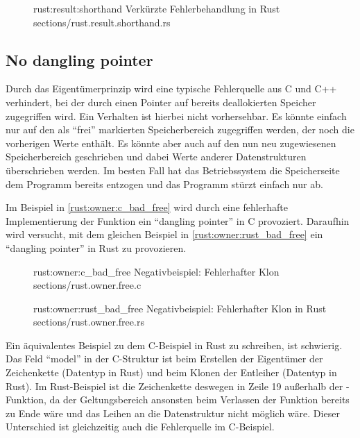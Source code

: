 \begin{figure}[H]
	\rustcinclude
		{rust:result:shorthand}
		{Verkürzte Fehlerbehandlung in Rust}
		{sections/rust.result.shorthand.rs}
\end{figure}



\subsection{No dangling pointer}
\label{rust:guarantee:no_dangling_pointer}

Durch das Eigentümerprinzip wird eine typische Fehlerquelle aus C und C++ verhindert, bei der durch einen Pointer auf bereits deallokierten Speicher zugegriffen wird.
Ein Verhalten ist hierbei nicht vorhersehbar. Es könnte einfach nur auf den als \enquote{frei} markierten Speicherbereich zugegriffen werden, der noch die vorherigen Werte enthält.
Es könnte aber auch auf den nun neu zugewiesenen Speicherbereich geschrieben und dabei Werte anderer Datenstrukturen überschrieben werden.
Im besten Fall hat das Betriebssystem die Speicherseite dem Programm bereits entzogen und das Programm stürzt einfach nur ab.

Im Beispiel in \autoref{rust:owner:c_bad_free} wird durch eine fehlerhafte Implementierung der Funktion  ein \enquote{dangling pointer} in C provoziert.
Daraufhin wird versucht, mit dem gleichen Beispiel in \autoref{rust:owner:rust_bad_free} ein \enquote{dangling pointer} in Rust zu provozieren.



\begin{figure}[H]
	\ccinclude
	{rust:owner:c_bad_free}
	{Negativbeispiel: Fehlerhafter Klon }
	{sections/rust.owner.free.c}
\end{figure}

\begin{figure}[H]
	\rustcinclude
	{rust:owner:rust_bad_free}
	{Negativbeispiel: Fehlerhafter Klon in Rust}
	{sections/rust.owner.free.rs}
\end{figure}

Ein äquivalentes Beispiel zu dem C-Beispiel in Rust zu schreiben, ist schwierig.
Das Feld \enquote{model} in der C-Struktur ist beim Erstellen der Eigentümer der Zeichenkette (Datentyp  in Rust) und beim Klonen der Entleiher (Datentyp  in Rust).
Im Rust-Beispiel ist die Zeichenkette deswegen in Zeile 19 außerhalb der -Funktion, da der Geltungsbereich ansonsten beim Verlassen der Funktion bereits zu Ende wäre und das Leihen an die Datenstruktur nicht möglich wäre.
Dieser Unterschied ist gleichzeitig auch die Fehlerquelle im C-Beispiel.

